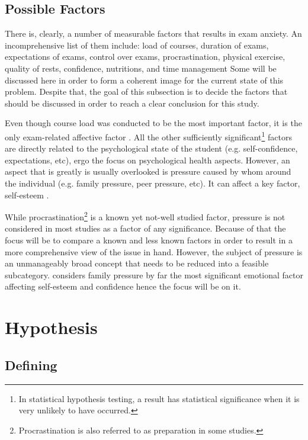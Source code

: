 \documentclass[12pt]{report}
\begin{document}
\subsection{Possible Factors}

There is, clearly, a number of measurable factors that results in exam anxiety.
An incomprehensive list of them include: load of courses, duration of exams,
expectations of exams, control over exams, procrastination, physical exercise,
quality of rests, confidence, nutritions, and time management Some will be
discussed here in order to form a coherent image for the current state of this
problem. Despite that, the goal of this subsection is to decide the factors that
should be discussed in order to reach a clear conclusion for this study.

Even though course load was conducted to be the most important factor, it is the
only exam-related affective factor \parencite{hashmat2008factors}. All the other
sufficiently significant\footnote{In statistical hypothesis testing, a result
has statistical significance when it is very unlikely to have occurred.} factors
are directly related to the psychological state of the student (e.g.
self-confidence, expectations, etc), ergo the focus on psychological health
aspects. However, an aspect that is greatly is usually overlooked is pressure
caused by whom around the individual (e.g. family pressure, peer pressure, etc).
It can affect a key factor, self-esteem \parencite{whitbeck1991family}.

While procrastination\footnote{Procrastination is also referred to as
preparation in some studies.} is a known yet not-well studied factor, pressure
is not considered in most studies as a factor of any significance. Because of
that the focus will be to compare a known and less known factors in order to
result in a more comprehensive view of the issue in hand. However, the subject
of pressure is an unmanageably broad concept that needs to be reduced into a
feasible subcategory. \cite{whitbeck1991family} considers family pressure by far
the most significant emotional factor affecting self-esteem and confidence hence
the focus will be on it.

\section{Hypothesis}

\subsection{Defining}
\end{document}
